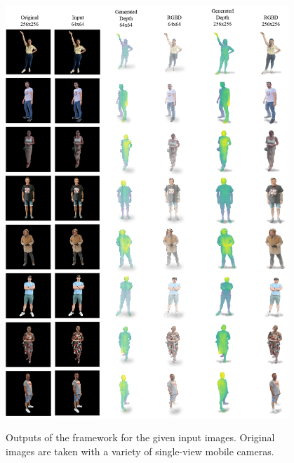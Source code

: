 \begin{figure}[t]
  \centering
  \caption{Outputs of the \modelname{} framework for the given input images. Original images are taken with a variety of single-view mobile cameras.}
  \includegraphics[width=0.95\textwidth]{illustrations/appendix_rgbd1.png}
  \label{fig:rgb_d_fusion_wild_rgbd_1}
\end{figure}

